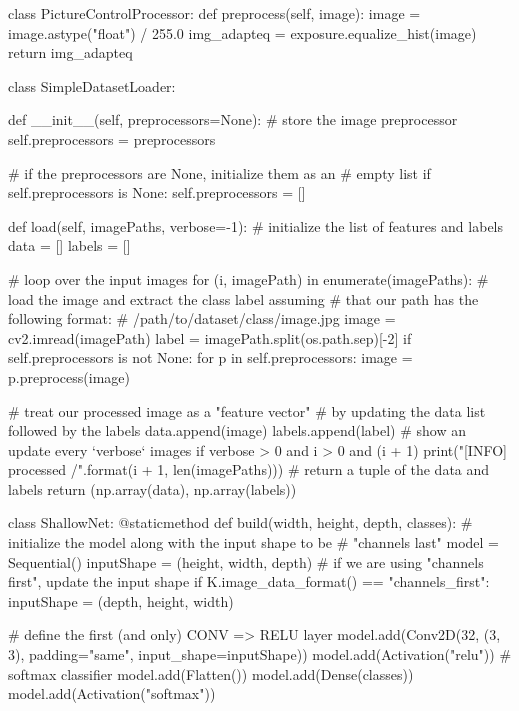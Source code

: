 \begin{python}
class PictureControlProcessor:
    def preprocess(self, image):
        image = image.astype("float") / 255.0
        img_adapteq = exposure.equalize_hist(image)
        return img_adapteq


class SimpleDatasetLoader:
    
    def __init__(self, preprocessors=None):
        # store the image preprocessor
        self.preprocessors = preprocessors

        # if the preprocessors are None, initialize them as an
        # empty list
        if self.preprocessors is None:
            self.preprocessors = []
            
    def load(self, imagePaths, verbose=-1):
        # initialize the list of features and labels
        data = []
        labels = []

        # loop over the input images
        for (i, imagePath) in enumerate(imagePaths):
            # load the image and extract the class label assuming
            # that our path has the following format:
            # /path/to/dataset/{class}/{image}.jpg
            image = cv2.imread(imagePath)
            label = imagePath.split(os.path.sep)[-2]
            if self.preprocessors is not None:
                for p in self.preprocessors:
                    image = p.preprocess(image)
            
            # treat our processed image as a "feature vector" # by updating the data list followed by the labels 
            data.append(image)
            labels.append(label)
            # show an update every ‘verbose‘ images
            if verbose > 0 and i > 0 and (i + 1) %
                print("[INFO] processed {}/{}".format(i + 1, len(imagePaths)))
            # return a tuple of the data and labels
        return (np.array(data), np.array(labels))


class ShallowNet:
    @staticmethod
    def build(width, height, depth, classes):
        # initialize the model along with the input shape to be
        # "channels last"
        model = Sequential()
        inputShape = (height, width, depth)
        # if we are using "channels first", update the input shape
        if K.image_data_format() == "channels_first":
            inputShape = (depth, height, width)
        
        # define the first (and only) CONV => RELU layer
        model.add(Conv2D(32, (3, 3), padding="same", input_shape=inputShape))
        model.add(Activation("relu"))
        # softmax classifier
        model.add(Flatten())
        model.add(Dense(classes))
        model.add(Activation("softmax"))


\end{python}

